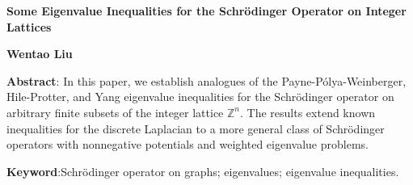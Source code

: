 \documentclass[11pt]{article}
\theoremstyle{definition}
\theoremstyle{remark}
\numberwithin{equation}{section}
\begin{document}
\noindent
{\Large \textbf{Some Eigenvalue Inequalities for the Schrödinger Operator on Integer Lattices}}\vspace{1\baselineskip}\par\noindent
{\large \textbf{Wentao Liu} }
\vspace{1\baselineskip}\par
\noindent
{\large \textbf{Abstract}}:
In this paper, we establish analogues of the Payne-Pólya-Weinberger, Hile-Protter,
and Yang eigenvalue inequalities for the Schrödinger operator on arbitrary finite
subsets of the integer lattice $\mathbb{Z}^n$. The results extend known inequalities
for the discrete Laplacian to a more general class of Schrödinger operators with
nonnegative potentials and weighted eigenvalue problems.
\vspace{0.5\baselineskip}\par\noindent
{\large \textbf{Keyword}}:Schrödinger operator on graphs; eigenvalues; eigenvalue inequalities.
\par\noindent
\end{document}
